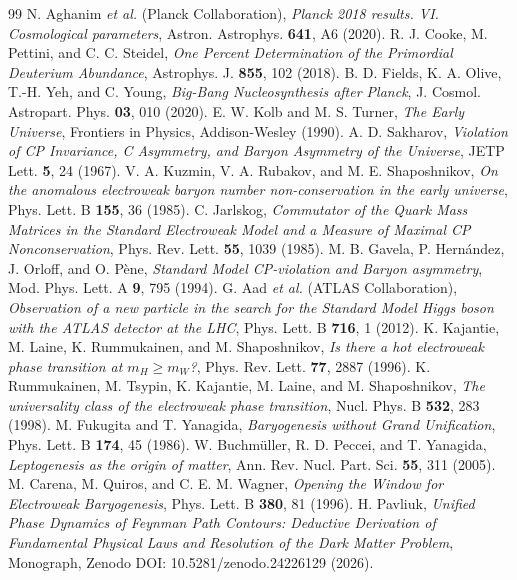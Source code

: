 \documentclass[11pt,a4paper]{article}
\begin{document}
\begin{thebibliography}{99}
 N. Aghanim \textit{et al.} (Planck Collaboration), \textit{Planck 2018 results. VI. Cosmological parameters}, Astron. Astrophys. \textbf{641}, A6 (2020).
 R. J. Cooke, M. Pettini, and C. C. Steidel, \textit{One Percent Determination of the Primordial Deuterium Abundance}, Astrophys. J. \textbf{855}, 102 (2018).
 B. D. Fields, K. A. Olive, T.-H. Yeh, and C. Young, \textit{Big-Bang Nucleosynthesis after Planck}, J. Cosmol. Astropart. Phys. \textbf{03}, 010 (2020).
 E. W. Kolb and M. S. Turner, \textit{The Early Universe}, Frontiers in Physics, Addison-Wesley (1990).
 A. D. Sakharov, \textit{Violation of CP Invariance, C Asymmetry, and Baryon Asymmetry of the Universe}, JETP Lett. \textbf{5}, 24 (1967).
 V. A. Kuzmin, V. A. Rubakov, and M. E. Shaposhnikov, \textit{On the anomalous electroweak baryon number non-conservation in the early universe}, Phys. Lett. B \textbf{155}, 36 (1985).
 C. Jarlskog, \textit{Commutator of the Quark Mass Matrices in the Standard Electroweak Model and a Measure of Maximal CP Nonconservation}, Phys. Rev. Lett. \textbf{55}, 1039 (1985).
 M. B. Gavela, P. Hern\'andez, J. Orloff, and O. P\`ene, \textit{Standard Model CP-violation and Baryon asymmetry}, Mod. Phys. Lett. A \textbf{9}, 795 (1994).
 G. Aad \textit{et al.} (ATLAS Collaboration), \textit{Observation of a new particle in the search for the Standard Model Higgs boson with the ATLAS detector at the LHC}, Phys. Lett. B \textbf{716}, 1 (2012).
 K. Kajantie, M. Laine, K. Rummukainen, and M. Shaposhnikov, \textit{Is there a hot electroweak phase transition at $m_H \ge m_W$?}, Phys. Rev. Lett. \textbf{77}, 2887 (1996).
 K. Rummukainen, M. Tsypin, K. Kajantie, M. Laine, and M. Shaposhnikov, \textit{The universality class of the electroweak phase transition}, Nucl. Phys. B \textbf{532}, 283 (1998).
 M. Fukugita and T. Yanagida, \textit{Baryogenesis without Grand Unification}, Phys. Lett. B \textbf{174}, 45 (1986).
 W. Buchm\"uller, R. D. Peccei, and T. Yanagida, \textit{Leptogenesis as the origin of matter}, Ann. Rev. Nucl. Part. Sci. \textbf{55}, 311 (2005).
 M. Carena, M. Quiros, and C. E. M. Wagner, \textit{Opening the Window for Electroweak Baryogenesis}, Phys. Lett. B \textbf{380}, 81 (1996).
 H. Pavliuk, \textit{Unified Phase Dynamics of Feynman Path Contours: Deductive Derivation of Fundamental Physical Laws and Resolution of the Dark Matter Problem}, Monograph, Zenodo DOI: 10.5281/zenodo.24226129 (2026).

\end{thebibliography}
\end{document}
